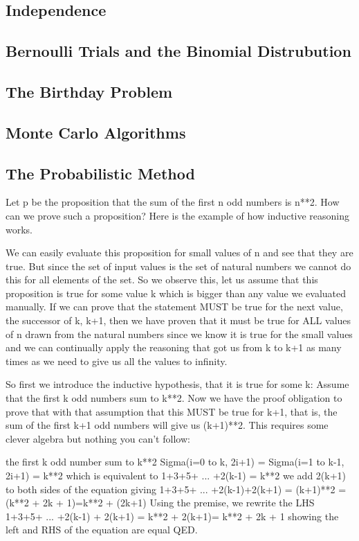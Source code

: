 \documentclass[11pt]{book} %
\theoremstyle {definition}
\theoremstyle {remark}
\begin{document}
    \subsection {Independence}
    \subsection {Bernoulli Trials and the Binomial Distrubution}
    \subsection {The Birthday Problem}
    \subsection {Monte Carlo Algorithms}
    \subsection {The Probabilistic Method}






Let p be the proposition that the sum of the first n odd numbers is n**2. How can we prove such a proposition? Here is the example of how inductive reasoning works. 

We can easily evaluate this proposition for small values of n and see that they are true. But since the set of input values is the set of natural numbers we cannot do this for all elements of the set. So we observe this, let us assume that this proposition is true for some value k which is bigger than any value we evaluated manually. If we can prove that the statement MUST be true for the next value, the successor of k, k+1, then we have proven that it must be true for ALL values of n drawn from the natural numbers since we know it is true for the small values and we can continually apply the reasoning that got us from k to k+1 as many times as we need to give us all the values to infinity.

So first we introduce the inductive hypothesis, that it is true for some k:
Assume that the first k odd numbers sum to k**2. Now we have the proof obligation to prove that with that assumption that this MUST be true for k+1, that is, the sum of the first k+1 odd numbers will give us (k+1)**2. This requires some clever algebra but nothing you can't follow:

the first k odd number sum to k**2
Sigma(i=0 to k, 2i+1) = Sigma(i=1 to k-1, 2i+1) = k**2
which is equivalent to 
1+3+5+ ... +2(k-1) = k**2
we add 2(k+1) to both sides of the equation giving
1+3+5+ ... +2(k-1)+2(k+1) = (k+1)**2 = (k**2 + 2k + 1)=k**2 + (2k+1)
Using the premise, we rewrite the LHS
1+3+5+ ... +2(k-1)  + 2(k+1) = k**2 + 2(k+1)= k**2 + 2k + 1
showing the left and RHS of the equation are equal QED.
\end{document}
